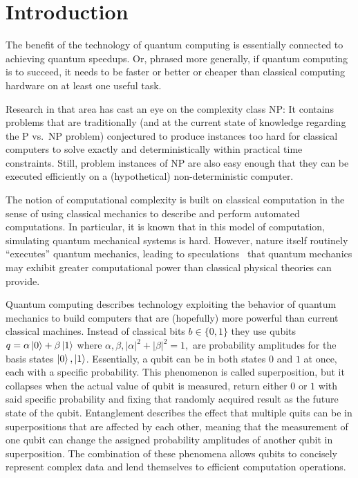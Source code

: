\section{Introduction}

The benefit of the technology of quantum computing is essentially connected to achieving quantum speedups. Or, phrased more generally, if quantum computing is to succeed, it needs to be faster or better or cheaper than classical computing hardware on at least one useful task.

Research in that area has cast an eye on the complexity class NP: It contains problems that are traditionally (and at the current state of knowledge regarding the P vs.\ NP problem) conjectured to produce instances too hard for classical computers to solve exactly and deterministically within practical time constraints. Still, problem instances of NP are also easy enough that they can be executed efficiently on a (hypothetical) non-deterministic computer.

The notion of computational complexity is built on classical
computation in the sense of using classical mechanics to describe and
perform automated computations. In particular, it is known that in this
model of computation, simulating quantum mechanical systems is hard. However, nature itself routinely ``executes'' quantum mechanics, leading to
speculations~\cite{feynman1981simulating} that quantum mechanics may
 exhibit greater computational power than classical physical theories
can provide.

Quantum computing describes technology exploiting the behavior of quantum mechanics to build computers that are (hopefully) more powerful than current classical machines. Instead of classical bits $b \in \{0, 1\}$ they use qubits $q = \alpha\ket{0} + \beta\ket{1}$ where $\alpha, \beta, |\alpha|^2 + |\beta|^2 = 1,$ are probability amplitudes for the basis states $\ket{0}, \ket{1}$. Essentially, a qubit can be in both states $0$ and $1$ at once, each with a specific probability. This phenomenon is called superposition, but it collapses when the actual value of qubit is measured, return either $0$ or $1$ with said specific probability and fixing that randomly acquired result as the future state of the qubit. Entanglement describes the effect that multiple quits can be in superpositions that are affected by each other, meaning that the measurement of one qubit can change the assigned probability amplitudes of another qubit in superposition. The combination of these phenomena allows qubits to concisely represent complex data and lend themselves to efficient computation operations.

